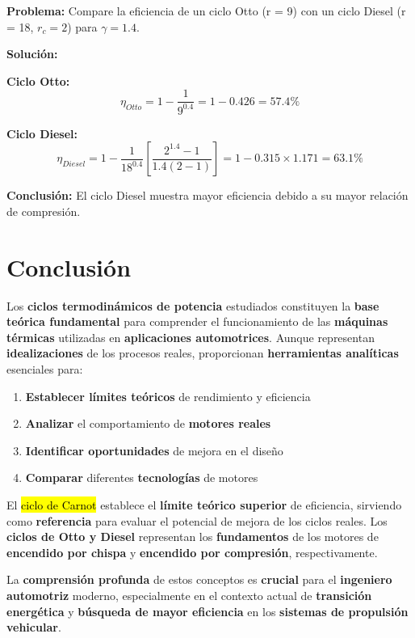 \documentclass{article}
\begin{document}
    \textbf{Problema:} Compare la eficiencia de un ciclo Otto (r = 9) con un ciclo Diesel (r = 18, $r_c = 2$) para $\gamma = 1.4$.

    \textbf{Solución:}

    \textbf{Ciclo Otto:}
    \begin{equation}
    \eta_{Otto} = 1 - \frac{1}{9^{0.4}} = 1 - 0.426 = 57.4\%
    \end{equation}

    \textbf{Ciclo Diesel:}
    \begin{equation}
    \eta_{Diesel} = 1 - \frac{1}{18^{0.4}} \left[ \frac{2^{1.4} - 1}{1.4(2-1)} \right] = 1 - 0.315 \times 1.171 = 63.1\%
    \end{equation}

    \textbf{Conclusión:} El ciclo Diesel muestra mayor eficiencia debido a su mayor relación de compresión.

    \section{Conclusión}

    Los \textbf{ciclos termodinámicos de potencia} estudiados constituyen la \textbf{base teórica fundamental} para comprender el funcionamiento de las \textbf{máquinas térmicas} utilizadas en \textbf{aplicaciones automotrices}. Aunque representan \textbf{idealizaciones} de los procesos reales, proporcionan \textbf{herramientas analíticas} esenciales para:

    \begin{enumerate}
        \item \textbf{Establecer límites teóricos} de rendimiento y eficiencia
        \item \textbf{Analizar} el comportamiento de \textbf{motores reales}
        \item \textbf{Identificar oportunidades} de mejora en el diseño
        \item \textbf{Comparar} diferentes \textbf{tecnologías} de motores
    \end{enumerate}

    El \hl{ciclo de Carnot} establece el \textbf{límite teórico superior} de eficiencia, sirviendo como \textbf{referencia} para evaluar el potencial de mejora de los ciclos reales. Los \textbf{ciclos de Otto y Diesel} representan los \textbf{fundamentos} de los motores de \textbf{encendido por chispa} y \textbf{encendido por compresión}, respectivamente.

    La \textbf{comprensión profunda} de estos conceptos es \textbf{crucial} para el \textbf{ingeniero automotriz} moderno, especialmente en el contexto actual de \textbf{transición energética} y \textbf{búsqueda de mayor eficiencia} en los \textbf{sistemas de propulsión vehicular}.
\end{document}
